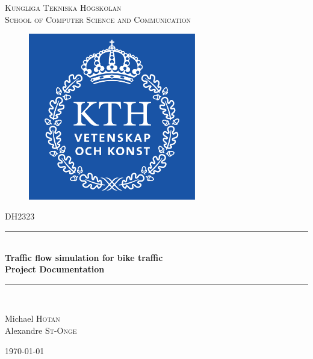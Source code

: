 \documentclass{scrartcl}
\newcommand{\HRule}{\rule{\linewidth}{0.5mm}}
\begin{document}
\lstset{style=sharpc}

\begin{titlepage}
\begin{center}


\textsc{ Kungliga Tekniska Högskolan \\ School of Computer Science and Communication}\\[1.5cm]

\begin{figure}[ht]
\begin{center}
\includegraphics[width=0.65\textwidth]{KTH}
\end{center}
\end{figure}

\textsc{\Large DH2323}\\[0.5cm]

\HRule \\[0.4cm]
 { \huge \bfseries Traffic flow simulation for bike traffic \\[0.4cm] }
{\large \bfseries  Project Documentation\\[0.4cm] }

\HRule \\[1.5cm]

\begin{minipage}{0.65\textwidth}
\begin{flushleft} \large
Michael \textsc{Hotan} \\
Alexandre \textsc{St-Onge}\\
\end{flushleft}
\end{minipage}

\vfill

{\large \today}

\end{center} 
\end{titlepage}
\end{document}
